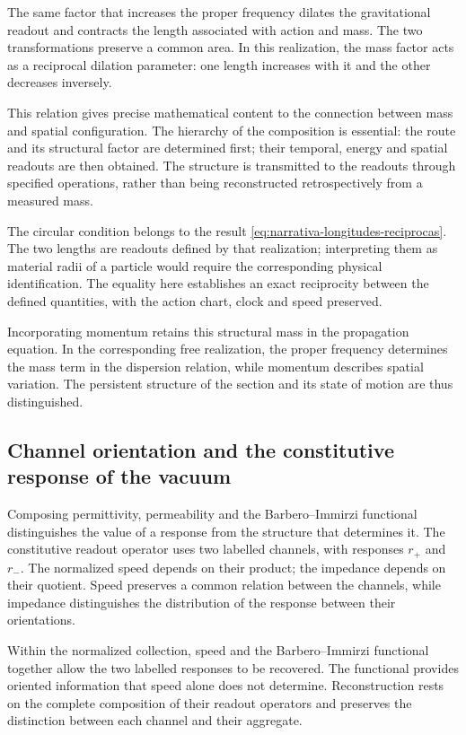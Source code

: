 The same factor that increases the proper frequency dilates the gravitational
readout and contracts the length associated with action and mass. The two
transformations preserve a common area. In this realization, the mass
factor acts as a reciprocal dilation parameter: one length increases with
it and the other decreases inversely.

This relation gives precise mathematical content to the connection
between mass and spatial configuration. The hierarchy of the composition is
essential: the route and its structural factor are determined first; their
temporal, energy and spatial readouts are then obtained. The structure
is transmitted to the readouts through specified operations, rather than
being reconstructed retrospectively from a measured mass.

The circular condition belongs to the result
\eqref{eq:narrativa-longitudes-reciprocas}. The two lengths are readouts
defined by that realization; interpreting them as material radii of
a particle would require the corresponding physical identification. The
equality here establishes an exact reciprocity between the defined
quantities, with the action chart, clock and speed preserved.

Incorporating momentum retains this structural mass in the propagation
equation. In the corresponding free realization, the proper
frequency determines the mass term in the dispersion relation, while momentum
describes spatial variation. The persistent structure of the section
and its state of motion are thus distinguished.

\subsection{Channel orientation and the constitutive response of the vacuum}
\label{subsec:narrativa-vacio-orientacion}

Composing permittivity, permeability and the Barbero--Immirzi functional
distinguishes the value of a response from the structure that
determines it. The constitutive readout operator uses two labelled channels, with
responses $r_+$ and $r_-$. The normalized speed depends on their product;
the impedance depends on their quotient. Speed preserves a common
relation between the channels, while impedance distinguishes the distribution of the
response between their orientations.

Within the normalized collection, speed and the
Barbero--Immirzi functional together allow the two labelled responses to be
recovered. The functional provides oriented information that speed
alone does not determine. Reconstruction rests on the complete composition
of their readout operators and preserves the distinction between each channel and their aggregate.

